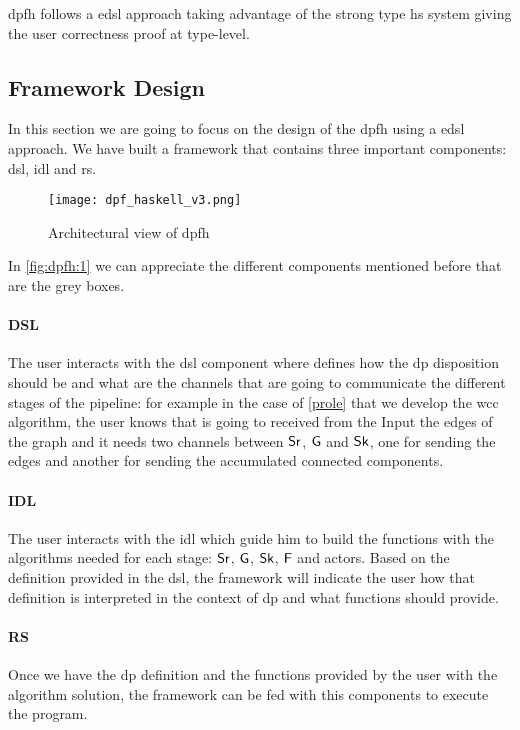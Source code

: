 \acrshort{dpfh} follows a \acrshort{edsl} approach taking advantage of the strong type \acrshort{hs} system giving the user correctness proof at type-level.

\subsection{Framework Design}
In this section we are going to focus on the design of the \acrshort{dpfh} using a \acrshort{edsl} approach. We have built a framework that contains
three important components: \acrshort{dsl}, \acrshort{idl} and \acrshort{rs}. 

\begin{figure}[!ht]
  \centering
  \begin{minipage}{\textwidth}
   \texttt{[image: dpf\_haskell\_v3.png]}
    \caption{Architectural view of \acrshort{dpfh}}
    \label{fig:dpfh:1}
  \end{minipage}
\end{figure}

In \autoref{fig:dpfh:1} we can appreciate the different components mentioned before that are the grey boxes.

\paragraph{DSL} The user interacts with the \acrshort{dsl} component where defines how the \acrshort{dp} disposition
should be and what are the channels that are going to communicate the different stages of the pipeline: for example in the
case of \autoref{prole} that we develop the \acrshort{wcc} algorithm, the user knows that is going to received from the Input 
the edges of the graph and it needs two channels between $\mathsf{Sr}$, $\mathsf{G}$ and $\mathsf{Sk}$, one for sending the edges and another for sending
the accumulated connected components. 

\paragraph{IDL} The user interacts with the \acrshort{idl} which guide him to build the functions with the algorithms needed for each stage: 
$\mathsf{Sr}$, $\mathsf{G}$, $\mathsf{Sk}$, $\mathsf{F}$ and actors. Based on the definition provided in the \acrshort{dsl}, the framework will indicate the user 
how that definition is interpreted in the context of \acrshort{dp} and what functions should provide.

\paragraph{RS} Once we have the \acrshort{dp} definition and the functions provided by the user with the algorithm solution, the framework
can be fed with this components to execute the program. 

